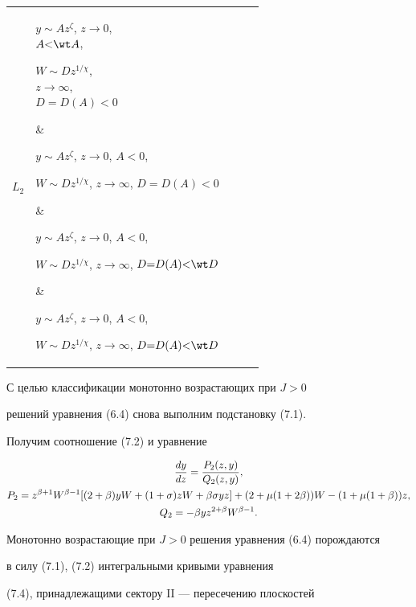 \begin{center}
\begin{tabular}{|p{0.7cm}|p{3.4cm}|p{3.4cm}|p{3.4cm}|p{3.4cm}|}
$L_2$ & \parbox{3.3cm}{$y{\sim} Az^\zeta$, $z\to0$,\\ $A{<}\wt A$, 


$W\sim Dz^{1/\chi}$,\\ $z\to\infty$,\\ $D=D(A)<0$} & 


\parbox{3.3cm}{$y\sim Az^\zeta$, $z\to0$, $A<0$, 


$W\sim Dz^{1/\chi}$, $z{\to}\infty$, $D{=}D(A){<}0$} & 


\parbox{3.3cm}{$y\sim Az^\zeta$, $z\to0$, $A<0$, 


$W\sim Dz^{1/\chi}$, $z{\to}\infty$, $D{=}D(A){<}\wt D$} & 


\parbox{3.3cm}{$y\sim Az^\zeta$, $z\to0$, $A<0$, 


$W\sim Dz^{1/\chi}$, $z{\to}\infty$, $D{=}D(A){<}\wt D$}\\ 


\hline 


\end{tabular} 


\end{center} 





С целью классификации монотонно возрастающих при $J>0$ 


решений уравнения (6.4) снова выполним подстановку (7.1).  


Получим соотношение (7.2) и уравнение 


\begin{gather} 


\frac{dy}{dz}=\frac{P_2(z,y)}{Q_2(z,y)},\\ 


% 


P_2=z^{\beta+1}W^{\beta-1}[(2+\beta)yW+(1+\sigma)zW+ 


\beta\sigma yz]+(2+\mu(1+2\beta))W- 


(1+\mu(1+\beta))z,\notag\\ 


% 


Q_2=-\beta yz^{2+\beta}W^{\beta-1}.\notag 


\end{gather} 


Монотонно возрастающие при $J>0$ решения уравнения (6.4) порождаются  


в силу (7.1), (7.2) интегральными кривыми уравнения  


(7.4), принадлежащими сектору II --- пересечению плоскостей 


